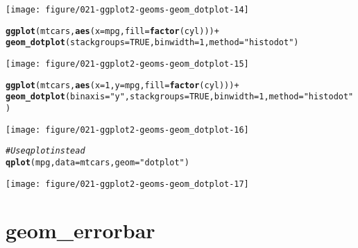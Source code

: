 \documentclass[a4paper,titlepage]{tufte-handout}\usepackage[]{graphicx}\usepackage[]{color}
\makeatletter
\def\maxwidth{ %
  \ifdim\Gin@nat@width>\linewidth
    \linewidth
  \else
    \Gin@nat@width
  \fi
}
\newcommand{\hlnum}[1]{\textcolor[rgb]{0.686,0.059,0.569}{#1}}%
\newcommand{\hlstr}[1]{\textcolor[rgb]{0.192,0.494,0.8}{#1}}%
\newcommand{\hlcom}[1]{\textcolor[rgb]{0.678,0.584,0.686}{\textit{#1}}}%
\newcommand{\hlopt}[1]{\textcolor[rgb]{0,0,0}{#1}}%
\newcommand{\hlstd}[1]{\textcolor[rgb]{0.345,0.345,0.345}{#1}}%
\newcommand{\hlkwc}[1]{\textcolor[rgb]{0.333,0.667,0.333}{#1}}%
\newcommand{\hlkwd}[1]{\textcolor[rgb]{0.737,0.353,0.396}{\textbf{#1}}}%
\newenvironment{kframe}{%
 \def\at@end@of@kframe{}%
 \ifinner\ifhmode%
  \def\at@end@of@kframe{\end{minipage}}%
  \begin{minipage}{\columnwidth}%
 \fi\fi%
 \def\FrameCommand##1{\hskip\@totalleftmargin \hskip-\fboxsep
 \colorbox{shadecolor}{##1}\hskip-\fboxsep
     \hskip-\linewidth \hskip-\@totalleftmargin \hskip\columnwidth}%
 \MakeFramed {\advance\hsize-\width
   \@totalleftmargin\z@ \linewidth\hsize
   \@setminipage}}%
 {\par\unskip\endMakeFramed%
 \at@end@of@kframe}
\newenvironment{knitrout}{}{} %
\makeatother
\begin{document}
\begin{knitrout}
\begin{kframe}
\begin{alltt}
\end{alltt}
\end{kframe}
\texttt{[image: figure/021-ggplot2-geoms-geom\_dotplot-14]} 
\begin{kframe}\begin{alltt}
\hlkwd{ggplot}\hlstd{(mtcars,} \hlkwd{aes}\hlstd{(}\hlkwc{x} \hlstd{= mpg,} \hlkwc{fill} \hlstd{=} \hlkwd{factor}\hlstd{(cyl)))} \hlopt{+}
  \hlkwd{geom_dotplot}\hlstd{(}\hlkwc{stackgroups} \hlstd{=} \hlnum{TRUE}\hlstd{,} \hlkwc{binwidth} \hlstd{=} \hlnum{1}\hlstd{,} \hlkwc{method} \hlstd{=} \hlstr{"histodot"}\hlstd{)}
\end{alltt}
\end{kframe}
\texttt{[image: figure/021-ggplot2-geoms-geom\_dotplot-15]} 
\begin{kframe}\begin{alltt}
\hlkwd{ggplot}\hlstd{(mtcars,} \hlkwd{aes}\hlstd{(}\hlkwc{x} \hlstd{=} \hlnum{1}\hlstd{,} \hlkwc{y} \hlstd{= mpg,} \hlkwc{fill} \hlstd{=} \hlkwd{factor}\hlstd{(cyl)))} \hlopt{+}
  \hlkwd{geom_dotplot}\hlstd{(}\hlkwc{binaxis} \hlstd{=} \hlstr{"y"}\hlstd{,} \hlkwc{stackgroups} \hlstd{=} \hlnum{TRUE}\hlstd{,} \hlkwc{binwidth} \hlstd{=} \hlnum{1}\hlstd{,} \hlkwc{method} \hlstd{=} \hlstr{"histodot"}\hlstd{)}
\end{alltt}
\end{kframe}
\texttt{[image: figure/021-ggplot2-geoms-geom\_dotplot-16]} 
\begin{kframe}\begin{alltt}
\hlcom{# Use qplot instead}
\hlkwd{qplot}\hlstd{(mpg,} \hlkwc{data} \hlstd{= mtcars,} \hlkwc{geom} \hlstd{=} \hlstr{"dotplot"}\hlstd{)}
\end{alltt}
\end{kframe}
\texttt{[image: figure/021-ggplot2-geoms-geom\_dotplot-17]} 

\end{knitrout}


\section{geom\_errorbar}
\end{document}
